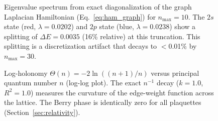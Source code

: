 \documentclass[aps,pra,twocolumn,superscriptaddress,longbibliography]{revtex4-2}
\begin{document}
\begin{figure}[h]
\centering
{}
\caption{Eigenvalue spectrum from exact diagonalization of the graph Laplacian Hamiltonian (Eq.~\ref{eq:ham_graph}) for $n_{\max} = 10$. The $2s$ state (red, $\lambda = 0.0202$) and $2p$ state (blue, $\lambda = 0.0238$) show a splitting of $\Delta E = 0.0035$ (16\% relative) at this truncation. This splitting is a discretization artifact that decays to $<$0.01\% by $n_{\max} = 30$.}
\label{fig:killswitch}
\end{figure}

\begin{figure}[h]
\centering
{}
\caption{Log-holonomy $\Theta(n) = -2\ln((n{+}1)/n)$ versus principal quantum number $n$ (log-log plot). The exact $n^{-1}$ decay ($k = 1.0$, $R^2 = 1.0$) measures the curvature of the edge-weight function across the lattice. The Berry phase is identically zero for all plaquettes (Section~\ref{sec:relativity}).}
\label{fig:relativity}
\end{figure}
\end{document}
